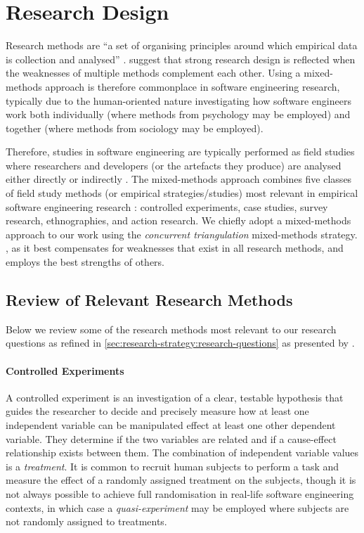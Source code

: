 \section{Research Design}
\label{sec:research-strategy:research-design}

Research methods are ``a set of organising principles around which empirical data is collection and analysed'' \citep{Easterbrook:2007ws}. \citet{Creswell:2017vn} suggest that strong research design is reflected when the weaknesses of multiple methods complement each other. Using a mixed-methods approach is therefore commonplace in software engineering research, typically due to the human-oriented nature investigating how software engineers work both individually (where methods from psychology may be employed) and together (where methods from sociology may be employed). 

Therefore, studies in software engineering are typically performed as field studies where researchers and developers (or the artefacts they produce) are analysed either directly or indirectly \citep{Singer:2007tu}. The mixed-methods approach combines five classes of field study methods (or empirical strategies/studies) most relevant in empirical software engineering research \citep{Easterbrook:2007ws, Wohlin:2012bu, Juristo:2013vj}: controlled experiments, case studies, survey research, ethnographies, and action research. We chiefly adopt a mixed-methods approach to our work using the \textit{concurrent triangulation} mixed-methods strategy. , as it best compensates for weaknesses that exist in all research methods, and employs the best strengths of others.



\subsection{Review of Relevant Research Methods}

Below we review some of the research methods most relevant to our research questions as refined in \cref{sec:research-strategy:research-questions} as presented by \citet{Easterbrook:2007ws}.

\paragraph{Controlled Experiments}
A controlled experiment is an investigation of a clear, testable hypothesis that guides the researcher to decide and precisely measure how at least one independent variable can be manipulated effect at least one other dependent variable. They determine if the two variables are related and if a cause-effect relationship exists between them. The combination of independent variable values is a \textit{treatment}. It is common to recruit human subjects to perform a task and measure the effect of a randomly assigned treatment on the subjects, though it is not always possible to achieve full randomisation in real-life software engineering contexts, in which case a \textit{quasi-experiment} may be employed where subjects are not randomly assigned to treatments.

